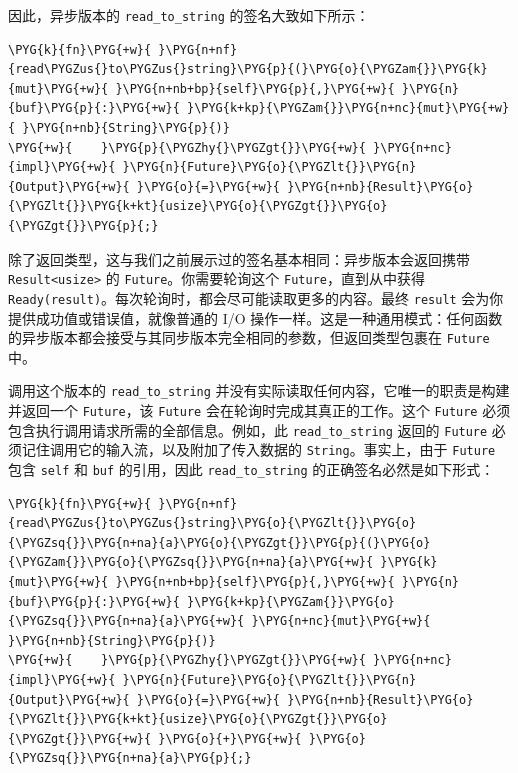 因此，异步版本的 \texttt{read\_to\_string} 的签名大致如下所示：

\begin{Verbatim}[commandchars=\\\{\},breaklines=true,breakanywhere=true,fontsize=\codefont,xleftmargin=17bp]
\PYG{k}{fn}\PYG{+w}{ }\PYG{n+nf}{read\PYGZus{}to\PYGZus{}string}\PYG{p}{(}\PYG{o}{\PYGZam{}}\PYG{k}{mut}\PYG{+w}{ }\PYG{n+nb+bp}{self}\PYG{p}{,}\PYG{+w}{ }\PYG{n}{buf}\PYG{p}{:}\PYG{+w}{ }\PYG{k+kp}{\PYGZam{}}\PYG{n+nc}{mut}\PYG{+w}{ }\PYG{n+nb}{String}\PYG{p}{)}
\PYG{+w}{    }\PYG{p}{\PYGZhy{}\PYGZgt{}}\PYG{+w}{ }\PYG{n+nc}{impl}\PYG{+w}{ }\PYG{n}{Future}\PYG{o}{\PYGZlt{}}\PYG{n}{Output}\PYG{+w}{ }\PYG{o}{=}\PYG{+w}{ }\PYG{n+nb}{Result}\PYG{o}{\PYGZlt{}}\PYG{k+kt}{usize}\PYG{o}{\PYGZgt{}}\PYG{o}{\PYGZgt{}}\PYG{p}{;}
\end{Verbatim}

除了返回类型，这与我们之前展示过的签名基本相同：异步版本会返回携带 \texttt{Result<usize>} 的 \texttt{Future}。你需要轮询这个 \texttt{Future}，直到从中获得 \texttt{Ready(result)}。每次轮询时，都会尽可能读取更多的内容。最终 \texttt{result} 会为你提供成功值或错误值，就像普通的 I/O 操作一样。这是一种通用模式：任何函数的异步版本都会接受与其同步版本完全相同的参数，但返回类型包裹在 \texttt{Future} 中。

调用这个版本的 \texttt{read\_to\_string} 并没有实际读取任何内容，它唯一的职责是构建并返回一个 \texttt{Future}，该 \texttt{Future} 会在轮询时完成其真正的工作。这个 \texttt{Future} 必须包含执行调用请求所需的全部信息。例如，此 \texttt{read\_to\_string} 返回的 \texttt{Future} 必须记住调用它的输入流，以及附加了传入数据的 \texttt{String}。事实上，由于 \texttt{Future} 包含 \texttt{self} 和 \texttt{buf} 的引用，因此 \texttt{read\_to\_string} 的正确签名必然是如下形式：

\begin{Verbatim}[commandchars=\\\{\},breaklines=true,breakanywhere=true,fontsize=\codefont,xleftmargin=17bp]
\PYG{k}{fn}\PYG{+w}{ }\PYG{n+nf}{read\PYGZus{}to\PYGZus{}string}\PYG{o}{\PYGZlt{}}\PYG{o}{\PYGZsq{}}\PYG{n+na}{a}\PYG{o}{\PYGZgt{}}\PYG{p}{(}\PYG{o}{\PYGZam{}}\PYG{o}{\PYGZsq{}}\PYG{n+na}{a}\PYG{+w}{ }\PYG{k}{mut}\PYG{+w}{ }\PYG{n+nb+bp}{self}\PYG{p}{,}\PYG{+w}{ }\PYG{n}{buf}\PYG{p}{:}\PYG{+w}{ }\PYG{k+kp}{\PYGZam{}}\PYG{o}{\PYGZsq{}}\PYG{n+na}{a}\PYG{+w}{ }\PYG{n+nc}{mut}\PYG{+w}{ }\PYG{n+nb}{String}\PYG{p}{)}
\PYG{+w}{    }\PYG{p}{\PYGZhy{}\PYGZgt{}}\PYG{+w}{ }\PYG{n+nc}{impl}\PYG{+w}{ }\PYG{n}{Future}\PYG{o}{\PYGZlt{}}\PYG{n}{Output}\PYG{+w}{ }\PYG{o}{=}\PYG{+w}{ }\PYG{n+nb}{Result}\PYG{o}{\PYGZlt{}}\PYG{k+kt}{usize}\PYG{o}{\PYGZgt{}}\PYG{o}{\PYGZgt{}}\PYG{+w}{ }\PYG{o}{+}\PYG{+w}{ }\PYG{o}{\PYGZsq{}}\PYG{n+na}{a}\PYG{p}{;}
\end{Verbatim}

